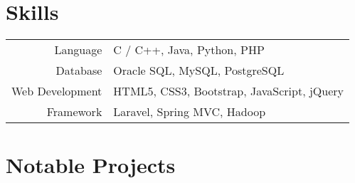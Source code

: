 \documentclass[letterpaper,10pt]{article}
\begin{document}
\begin{comment}
\section{Scholarships and Certificates}
\begin{tabular}{rl}
 \textsc{Sept.} 2006 & Scholarship for graduate students with an outstanding curriculum \footnotesize(\EURcr 30,000)\normalsize\\
\textsc{June} 2006 & {\textsc{Gmat}\textregistered}\setmainfont[SmallCapsFont=Fontin-SmallCaps.otf]{Fontin.otf}: 730 (\textsc{q:50;v:39}) 96\textsuperscript{th} percentile; \textsc{awa}: 6.0/6.0 (89\textsuperscript{th} percentile)
\end{tabular}
\end{comment}

\section{Skills}
\begin{tabular}{rl}
Language & C / C++, Java, Python, \textsc{PHP}\\
Database & Oracle \textsc{SQL}, My\textsc{SQL}, PostgreSQL \\
Web Development & \textsc{HTML5}, \textsc{CSS3}, Bootstrap, JavaScript, jQuery \\
Framework & Laravel, Spring MVC, Hadoop \\
\end{tabular}

\section{Notable Projects}
\end{document}
